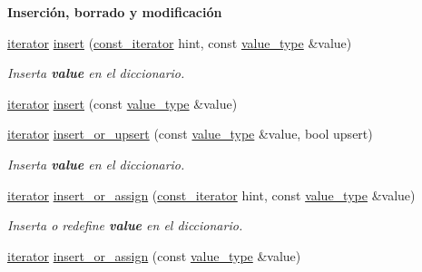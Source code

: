 \begin{Indent}\textbf{ Inserción, borrado y modificación}\par
\begin{DoxyCompactItemize}
\item 
\hyperlink{classaed2_1_1map_1_1iterator}{iterator} \hyperlink{classaed2_1_1map_a6941cde9a79c27f054b5c97a587a1854_a6941cde9a79c27f054b5c97a587a1854}{insert} (\hyperlink{classaed2_1_1map_1_1const__iterator}{const\+\_\+iterator} hint, const \hyperlink{classaed2_1_1map_a719db98e0ff9a837610f76be33264680_a719db98e0ff9a837610f76be33264680}{value\+\_\+type} \&value)
\begin{DoxyCompactList}\small\item\em Inserta {\bfseries value} en el diccionario. \end{DoxyCompactList}\item 
\hyperlink{classaed2_1_1map_1_1iterator}{iterator} \hyperlink{classaed2_1_1map_a60aacba06b1579630b3c8e996cf248c8_a60aacba06b1579630b3c8e996cf248c8}{insert} (const \hyperlink{classaed2_1_1map_a719db98e0ff9a837610f76be33264680_a719db98e0ff9a837610f76be33264680}{value\+\_\+type} \&value)
\item 
\hyperlink{classaed2_1_1map_1_1iterator}{iterator} \hyperlink{classaed2_1_1map_aef47582a93a069c4ec95da8c595e4fee_aef47582a93a069c4ec95da8c595e4fee}{insert\+\_\+or\+\_\+upsert} (const \hyperlink{classaed2_1_1map_a719db98e0ff9a837610f76be33264680_a719db98e0ff9a837610f76be33264680}{value\+\_\+type} \&value, bool upsert)
\begin{DoxyCompactList}\small\item\em Inserta {\bfseries value} en el diccionario. \end{DoxyCompactList}\item 
\hyperlink{classaed2_1_1map_1_1iterator}{iterator} \hyperlink{classaed2_1_1map_a2ef6723c183916276b0afc4a4c721475_a2ef6723c183916276b0afc4a4c721475}{insert\+\_\+or\+\_\+assign} (\hyperlink{classaed2_1_1map_1_1const__iterator}{const\+\_\+iterator} hint, const \hyperlink{classaed2_1_1map_a719db98e0ff9a837610f76be33264680_a719db98e0ff9a837610f76be33264680}{value\+\_\+type} \&value)
\begin{DoxyCompactList}\small\item\em Inserta o redefine {\bfseries value} en el diccionario. \end{DoxyCompactList}\item 
\hyperlink{classaed2_1_1map_1_1iterator}{iterator} \hyperlink{classaed2_1_1map_a9128a806713bcc999ebd8a97ab77e765_a9128a806713bcc999ebd8a97ab77e765}{insert\+\_\+or\+\_\+assign} (const \hyperlink{classaed2_1_1map_a719db98e0ff9a837610f76be33264680_a719db98e0ff9a837610f76be33264680}{value\+\_\+type} \&value)

\end{DoxyCompactItemize}
\end{Indent}

